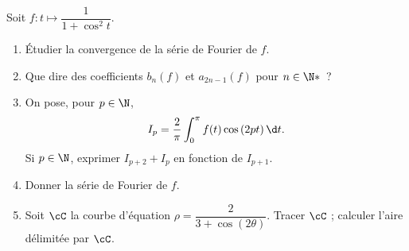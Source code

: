\begin{enonce}
\begin{exercise}[ID={RMS123 E919, Centrale PC},subtitle={},tags={}, difficulty={0}]
Soit $f:t\mapsto \dfrac{1}{1+\cos^2 t}$.
\begin{enumerate}
  \item Étudier la convergence de la série de Fourier de $f$.
  \item Que dire des coefficients $b_n(f)$ et $a_{2n-1}(f)$ pour $n\in\N*$~?
  \item On pose, pour $p\in\N$,
    \begin{equation*}
      I_p=\frac2\pi\int_0^\pi f(t)\cos\left( 2pt \right)\d t.
    \end{equation*}
    Si $p\in\N$, exprimer $I_{p+2}+I_{p}$ en fonction de $I_{p+1}$.
  \item Donner la série de Fourier de $f$.
  \item Soit $\cC$ la courbe d'équation $\rho=\dfrac{2}{3+\cos(2\theta)}$.
    Tracer $\cC$ ; calculer l'aire délimitée par $\cC$.
\end{enumerate}
\end{exercise}
\begin{solution}
\end{solution}
\end{enonce}
